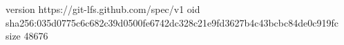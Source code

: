 version https://git-lfs.github.com/spec/v1
oid sha256:035d0775c6c682c39d0500fe6742dc328c21e9fd3627b4c43bcbc84de0c919fc
size 48676
